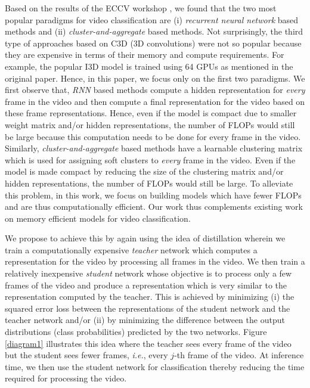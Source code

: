 \documentclass[10pt,twocolumn,letterpaper]{article}
\begin{document}
Based on the results of the ECCV workshop \cite{summary-paper}, we found that the two most popular paradigms for video classification are (i) \textit{recurrent neural network} based methods and (ii) \textit{cluster-and-aggregate} based methods. Not surprisingly, the third type of approaches based on C3D (3D convolutions) \cite{i3d} were not so popular because they are expensive in terms of their memory and compute requirements. For example, the popular I3D model \cite{i3d} is trained using 64 GPUs as mentioned in the original paper. Hence, in this paper, we focus only on the first two paradigms. We first observe that, \textit{RNN} based methods \cite{paper2,paper5,paper9} compute a hidden representation for \textit{every} frame in the video and then compute a final representation for the video based on these frame representations. Hence, even if the model is compact due to smaller weight matrix and/or hidden representations, the number of FLOPs would still be large because this computation needs to be done for every frame in the video. Similarly, \textit{cluster-and-aggregate} based methods \cite{willow,paper1,paper3,paper4,paper10} have a learnable clustering matrix which is used for assigning soft clusters to \textit{every} frame in the video. Even if the model is made compact by reducing the size of the clustering matrix and/or hidden representations, the number of FLOPs would still be large. To alleviate this problem, in this work, we focus on building models which have fewer FLOPs and are thus computationally efficient. Our work thus complements existing work on memory efficient models for video classification.





We propose to achieve 
this by again using the idea of distillation wherein we train a computationally expensive \textit{teacher} network which computes a representation for the video by processing all frames in the video. We then train a relatively inexpensive \textit{student} network whose objective is to process only a few frames of the video and produce a representation which is very similar to the representation computed by the teacher. This is achieved by minimizing (i) the squared error loss between the representations of the student network and the teacher network and/or (ii) by minimizing the difference between the output distributions (class probabilities) predicted by the two networks. Figure \ref{diagram1} illustrates this idea where the teacher sees every frame of the video but the student sees fewer frames, \textit{i.e.}, every $j$-th frame of the video. At inference time, we then use the student network for classification thereby reducing  the time required for processing the video. 
\end{document}
